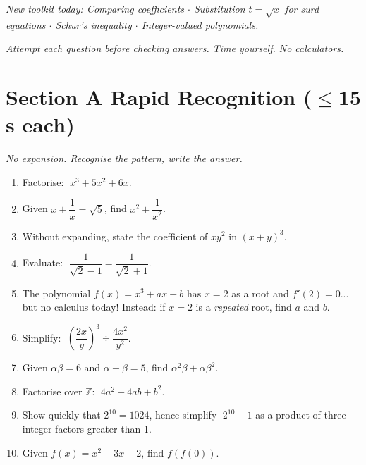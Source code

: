 \documentclass[11pt,a4paper]{article}
\begin{document}
\noindent\textit{New toolkit today: Comparing coefficients $\cdot$ Substitution $t = \sqrt{x}$ for surd equations $\cdot$ Schur's inequality $\cdot$ Integer-valued polynomials.}

\vspace{2pt}
\noindent\textit{Attempt each question before checking answers. Time yourself. No calculators.}

\section*{Section A \quad Rapid Recognition \hfill{\normalfont\small($\leq$15 s each)}}

\noindent\textit{No expansion. Recognise the pattern, write the answer.}

\begin{enumerate}

\item Factorise: $\;x^3 + 5x^2 + 6x$.

\item Given $x + \dfrac{1}{x} = \sqrt{5}$, find $x^2 + \dfrac{1}{x^2}$.

\item Without expanding, state the coefficient of $xy^2$ in $(x+y)^3$.

\item Evaluate: $\;\dfrac{1}{\sqrt{2}-1} - \dfrac{1}{\sqrt{2}+1}$.

\item The polynomial $f(x) = x^3 + ax + b$ has $x = 2$ as a root and
      $f'(2) = 0$... but no calculus today! Instead: if $x=2$ is a
      \emph{repeated} root, find $a$ and $b$.

\item Simplify: $\;\left(\dfrac{2x}{y}\right)^3 \div \dfrac{4x^2}{y^2}$.

\item Given $\alpha\beta = 6$ and $\alpha + \beta = 5$, find $\alpha^2\beta + \alpha\beta^2$.

\item Factorise over $\mathbb{Z}$: $\;4a^2 - 4ab + b^2$.

\item Show quickly that $2^{10} = 1024$, hence simplify $\;2^{10} - 1$
      as a product of three integer factors greater than 1.

\item Given $f(x) = x^2 - 3x + 2$, find $f(f(0))$.

\end{enumerate}
\end{document}
